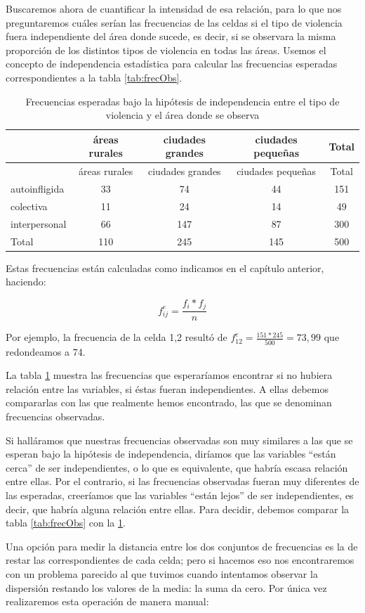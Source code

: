 \documentclass[]{book}
\begin{document}
Buscaremos ahora de cuantificar la intensidad de esa relación, para lo que nos preguntaremos cuáles serían las frecuencias de las celdas si el tipo de violencia fuera independiente del área donde sucede, es decir, si se observara la misma proporción de los distintos tipos de violencia en todas las áreas. Usemos el concepto de independencia estadística para calcular las frecuencias esperadas correspondientes a la tabla \ref{tab:frecObs}.

\begin{longtable}[]{@{}lcccc@{}}
\caption{\label{tab:frecEsperada}Frecuencias esperadas bajo la hipótesis de independencia entre el tipo de violencia y el área donde se observa}\tabularnewline
\toprule
& áreas rurales & ciudades grandes & ciudades pequeñas & Total\tabularnewline
\midrule
\endfirsthead
\toprule
& áreas rurales & ciudades grandes & ciudades pequeñas & Total\tabularnewline
\midrule
\endhead
autoinfligida & 33 & 74 & 44 & 151\tabularnewline
colectiva & 11 & 24 & 14 & 49\tabularnewline
interpersonal & 66 & 147 & 87 & 300\tabularnewline
Total & 110 & 245 & 145 & 500\tabularnewline
\bottomrule
\end{longtable}

Estas frecuencias están calculadas como indicamos en el capítulo
anterior, haciendo:

\[f_{ij}^{e} = \frac{f_{i}*f_{j}}{n}\]

Por ejemplo, la frecuencia de la celda 1,2 resultó de \(f_{1 2}^{e} = \frac{151*245}{500} = 73,99\) que redondeamos a 74.

La tabla \ref{tab:frecEsperada} muestra las frecuencias que esperaríamos encontrar si no hubiera relación entre las variables, si éstas fueran independientes. A ellas debemos compararlas con las que realmente hemos encontrado, las que se denominan frecuencias observadas.

Si halláramos que nuestras frecuencias observadas son muy similares a
las que se esperan bajo la hipótesis de independencia, diríamos que las variables ``están cerca'' de ser independientes, o lo que es equivalente, que habría escasa relación entre ellas. Por el contrario, si las frecuencias observadas fueran muy diferentes de las esperadas, creeríamos que las variables ``están lejos'' de ser independientes, es decir, que habría alguna relación entre ellas. Para decidir, debemos comparar la tabla \ref{tab:frecObs} con la \ref{tab:frecEsperada}.

Una opción para medir la distancia entre los dos conjuntos de frecuencias es la de restar las correspondientes de cada celda; pero si hacemos eso nos encontraremos con un problema parecido al que tuvimos cuando intentamos observar la dispersión restando los valores de la media: la suma da cero. Por única vez realizaremos esta operación de manera manual:
\end{document}
